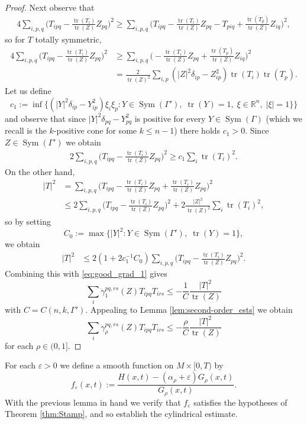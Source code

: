 \documentclass[12pt]{amsart}
\DeclareMathOperator{\tr}{tr}
\DeclareMathOperator{\sym}{Sym}
\begin{document}
\begin{proof}
Next observe that
\begin{align*}
 4\sum_{i,p,q} \bigg(T_{ipq}- \frac{\tr(T_i)}{\tr(Z)} Z_{pq} \bigg)^2 \geq \sum_{i,p,q} \bigg(T_{ipq}- \frac{\tr(T_i)}{\tr(Z)} Z_{pq} -T_{piq} + \frac{\tr(T_p)}{\tr(Z)} Z_{iq} \bigg)^2,
\end{align*}
so for $T$ totally symmetric,
\begin{align*}
 4\sum_{i,p,q} \bigg(T_{ipq}- \frac{\tr(T_i)}{\tr(Z)} Z_{pq} \bigg)^2 &\geq \sum_{i,p,q} \bigg(- \frac{\tr(T_i)}{\tr(Z)} Z_{pq} + \frac{\tr(T_p)}{\tr(Z)} Z_{iq} \bigg)^2\\
 &=\frac{2}{\tr(Z)^2} \sum_{i,p} (|Z|^2 \delta_{ip} - Z_{ip}^2)  \tr(T_i)\tr(T_p). 
\end{align*}
Let us define 
\[c_1 := \inf \{ (|Y|^2 \delta_{ip} - Y_{ip}^2 )\xi_i \xi_p: Y \in \sym(\Gamma'), \; \tr(Y) = 1, \; \xi \in \mathbb{R}^{n}, \; |\xi|=1\}\}\]
and observe that since $|Y|^2 \delta_{pq} - Y_{pq}^2$ is positive for every $Y \in \sym(\Gamma)$ (which we recall is the $k$-positive cone for some $k \leq n-1$) there holds $c_1 > 0$. Since $Z \in \sym(\Gamma')$ we obtain 
\begin{align*}
 2\sum_{i,p,q} \bigg(T_{ipq}- \frac{\tr(T_i)}{\tr(Z)} Z_{pq} \bigg)^2 \geq c_1 \sum_i \tr(T_i)^2. 
\end{align*}
On the other hand,
\begin{align*}
|T|^2 & = \sum_{i,p,q} \bigg(T_{ipq}- \frac{\tr(T_i)}{\tr(Z)} Z_{pq}  + \frac{\tr(T_i)}{\tr(Z)} Z_{pq}\bigg)^2\\
 &\leq 2\sum_{i,p,q} \bigg(T_{ipq}- \frac{\tr(T_i)}{\tr(Z)} Z_{pq} \bigg)^2 + 2 \frac{|Z|^2}{\tr(Z)^2} \sum_i \tr(T_i)^2,
\end{align*}
so by setting 
\[C_0 := \max\{|Y|^2 : Y \in \sym (\Gamma'), \; \tr(Y) = 1\},\]
we obtain
\begin{align*}
|T|^2 & \leq 2(1+ 2c_1^{-1} C_0)\sum_{i,p,q} \bigg(T_{ipq}- \frac{\tr(T_i)}{\tr(Z)} Z_{pq} \bigg)^2.
\end{align*}
Combining this with \eqref{eq:good_grad_1} gives 
\[\sum_i \ddot \gamma_1^{pq,rs}(Z) T_{ipq} T_{irs} \leq - \frac{1}{C} \frac{|T|^2}{\tr(Z)}\]
with $C = C(n,k,\Gamma')$. Appealing to Lemma \ref{lem:second-order_ests} we obtain
\[\sum_i \ddot \gamma_\rho^{pq,rs}(Z) T_{ipq} T_{irs} \leq - \frac{\rho}{C} \frac{|T|^2}{\tr(Z)}\]
for each $\rho \in (0,1]$.
\end{proof}

For each $\varepsilon >0$ we define a smooth function on $M\times[0,T)$ by
\[f_\varepsilon(x,t) := \frac{H(x,t) - (\alpha_{\rho} + \varepsilon) G_\rho(x,t)}{G_\rho(x,t)}.\]
With the previous lemma in hand we verify that $f_\varepsilon$ satisfies the hypotheses of Theorem \ref{thm:Stamp}, and so establish the cylindrical estimate.
\end{document}
